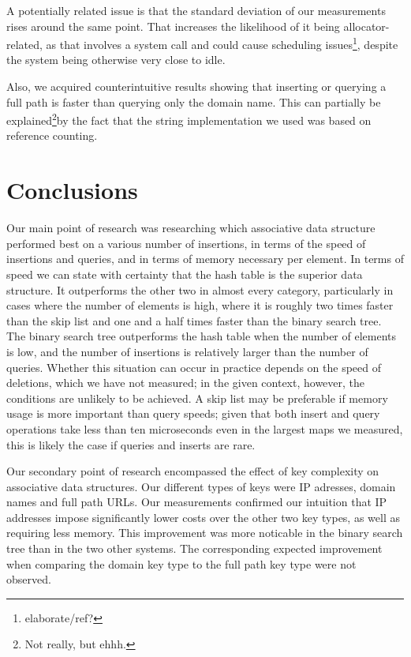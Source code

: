 \documentclass[12pt,a4paper]{article}
\begin{document}
    A potentially related issue is that the standard deviation of our measurements rises around the
    same point.  That increases the likelihood of it being allocator-related, as that involves a
    system call and could cause scheduling issues\footnote{elaborate/ref?}, despite the system being
    otherwise very close to idle.

    Also, we acquired counterintuitive results showing that inserting or querying a full path is
    faster than querying only the domain name.  This can partially be explained\footnote{Not really,
    but ehhh.}by the fact that the string implementation we used was based on reference counting.

    \section{Conclusions}
    Our main point of research was researching which associative data structure performed best on a
    various number of insertions, in terms of the speed of insertions and queries, and in terms of
    memory necessary per element.  In terms of speed we can state with certainty that the hash table
    is the superior data structure.  It outperforms the other two in almost every category,
    particularly in cases where the number of elements is high, where it is roughly two times faster
    than the skip list and one and a half times faster than the binary search tree.  The binary
    search tree outperforms the hash table when the number of elements is low, and the number of
    insertions is relatively larger than the number of queries.  Whether this situation can occur in
    practice depends on the speed of deletions, which we have not measured; in the given context,
    however, the conditions are unlikely to be achieved.  A skip list may be preferable if memory
    usage is more important than query speeds; given that both insert and query operations take less
    than ten microseconds even in the largest maps we measured, this is likely the case if queries
    and inserts are rare.

    Our secondary point of research encompassed the effect of key complexity on associative data
    structures.  Our different types of keys were IP adresses, domain names and full path URLs.  Our
    measurements confirmed our intuition that IP addresses impose significantly lower costs over the
    other two key types, as well as requiring less memory.  This improvement was more noticable in
    the binary search tree than in the two other systems.  The corresponding expected improvement
    when comparing the domain key type to the full path key type were not observed.
\end{document}

